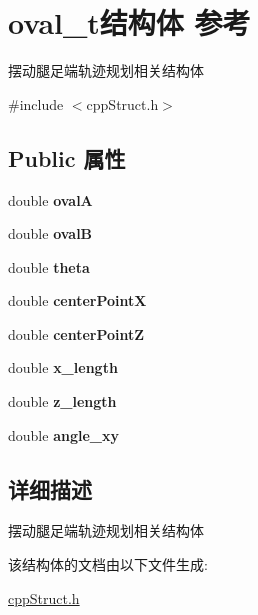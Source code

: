 \hypertarget{structoval__t}{}\section{oval\+\_\+t结构体 参考}
\label{structoval__t}


摆动腿足端轨迹规划相关结构体  




{\ttfamily \#include $<$cpp\+Struct.\+h$>$}

\subsection*{Public 属性}
\begin{DoxyCompactItemize}
\item 
\mbox{\label{structoval__t_a91aaa3814db4955431f009dd01e2c7e5}} 
double {\bfseries ovalA}
\item 
\mbox{\label{structoval__t_acd0dcf570b77982378d7c0fe1c050024}} 
double {\bfseries ovalB}
\item 
\mbox{\label{structoval__t_afd471d2b7e4b609b1cb0e44628a928e6}} 
double {\bfseries theta}
\item 
\mbox{\label{structoval__t_a9facd5fa5c035520b590ecd59ba7d8a9}} 
double {\bfseries center\+PointX}
\item 
\mbox{\label{structoval__t_a886019c4828650970c00fbb763ff921b}} 
double {\bfseries center\+PointZ}
\item 
\mbox{\label{structoval__t_ab48b43aaeeeeb42b4dac3b60c17118f9}} 
double {\bfseries x\+\_\+length}
\item 
\mbox{\label{structoval__t_ae9ad9d92cc182e37bbca319aded46ae4}} 
double {\bfseries z\+\_\+length}
\item 
\mbox{\label{structoval__t_a2a3a292f22d73be98d5fb17d9140e9f1}} 
double {\bfseries angle\+\_\+xy}
\end{DoxyCompactItemize}


\subsection{详细描述}
摆动腿足端轨迹规划相关结构体 

该结构体的文档由以下文件生成\+:\begin{DoxyCompactItemize}
\item 
\hyperlink{cppStruct_8h}{cpp\+Struct.\+h}\end{DoxyCompactItemize}
